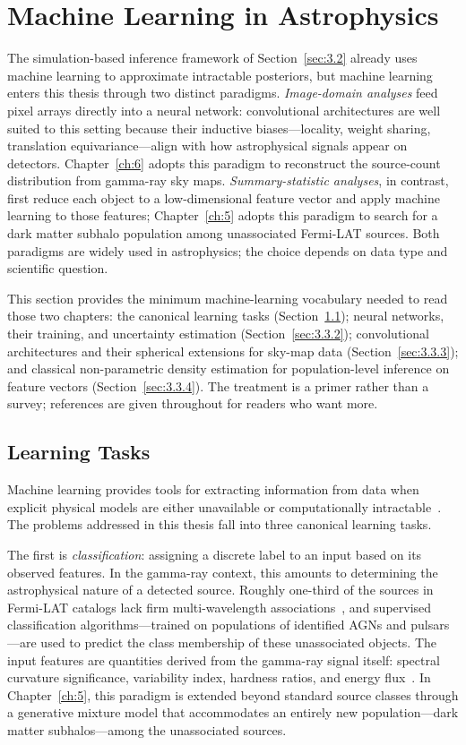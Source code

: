 \section{Machine Learning in Astrophysics}
\label{sec:3.3}
The simulation-based inference framework of Section~\ref{sec:3.2} already uses machine learning to approximate intractable posteriors, but machine learning enters this thesis through two distinct paradigms.
\emph{Image-domain analyses} feed pixel arrays directly into a neural network: convolutional architectures are well suited to this setting because their inductive biases---locality, weight sharing, translation equivariance---align with how astrophysical signals appear on detectors.
Chapter~\ref{ch:6} adopts this paradigm to reconstruct the source-count distribution from gamma-ray sky maps.
\emph{Summary-statistic analyses}, in contrast, first reduce each object to a low-dimensional feature vector and apply machine learning to those features; Chapter~\ref{ch:5} adopts this paradigm to search for a dark matter subhalo population among unassociated Fermi-LAT sources.
Both paradigms are widely used in astrophysics; the choice depends on data type and scientific question.

This section provides the minimum machine-learning vocabulary needed to read those two chapters: the canonical learning tasks (Section~\ref{sec:3.3.1}); neural networks, their training, and uncertainty estimation (Section~\ref{sec:3.3.2}); convolutional architectures and their spherical extensions for sky-map data (Section~\ref{sec:3.3.3}); and classical non-parametric density estimation for population-level inference on feature vectors (Section~\ref{sec:3.3.4}).
The treatment is a primer rather than a survey; references are given throughout for readers who want more.

\subsection{Learning Tasks}
\label{sec:3.3.1}

Machine learning provides tools for extracting information from data when explicit physical models are either unavailable or computationally intractable~\cite{bishop,Hastie:2009}.
The problems addressed in this thesis fall into three canonical learning tasks.

The first is \textit{classification}: assigning a discrete label to an input based on its observed features.
In the gamma-ray context, this amounts to determining the astrophysical nature of a detected source.
Roughly one-third of the sources in Fermi-LAT catalogs lack firm multi-wavelength associations~\cite{Bhat:2022}, and supervised classification algorithms---trained on populations of identified AGNs and pulsars---are used to predict the class membership of these unassociated objects.
The input features are quantities derived from the gamma-ray signal itself: spectral curvature significance, variability index, hardness ratios, and energy flux~\cite{Bhat:2022}.
In Chapter~\ref{ch:5}, this paradigm is extended beyond standard source classes through a generative mixture model that accommodates an entirely new population---dark matter subhalos---among the unassociated sources.

